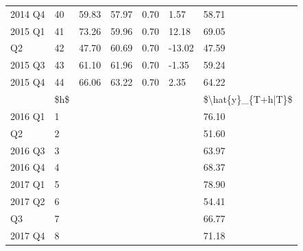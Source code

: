\documentclass[]{book}
\begin{document}
\begin{table}[t]
\begin{tabular}{lllllll}
2014 Q4 & 40 & 59.83 & 57.97 & 0.70 & 1.57 & 58.71\\
2015 Q1 & 41 & 73.26 & 59.96 & 0.70 & 12.18 & 69.05\\
\addlinespace
2015 Q2 & 42 & 47.70 & 60.69 & 0.70 & -13.02 & 47.59\\
2015 Q3 & 43 & 61.10 & 61.96 & 0.70 & -1.35 & 59.24\\
2015 Q4 & 44 & 66.06 & 63.22 & 0.70 & 2.35 & 64.22\\
 & \$h\$ &  &  &  &  & \$\textbackslash{}hat\{y\}\_\{T+h|T\}\$\\
2016 Q1 & 1 &  &  &  &  & 76.10\\
\addlinespace
2016 Q2 & 2 &  &  &  &  & 51.60\\
2016 Q3 & 3 &  &  &  &  & 63.97\\
2016 Q4 & 4 &  &  &  &  & 68.37\\
2017 Q1 & 5 &  &  &  &  & 78.90\\
2017 Q2 & 6 &  &  &  &  & 54.41\\
\addlinespace
2017 Q3 & 7 &  &  &  &  & 66.77\\
2017 Q4 & 8 &  &  &  &  & 71.18\\
\bottomrule
\end{tabular}
\end{table}
\end{document}
